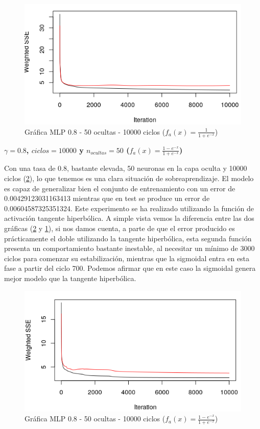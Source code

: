 \documentclass[11pt,spanish,listoffigures,listoftables]{tfgetsinf}
\begin{document}
\begin{figure}[H]
\centering
\includegraphics[scale=0.5]{500810000sig}
\caption{Gráfica MLP 0.8 - 50 ocultas - 10000 ciclos ($f_{a}(x) = \frac{1}{1+e^{-x}}$)}\label{fig:500810000sig}
\end{figure}

\par \textbf{$\gamma = 0.8$, $ciclos = 10000$ y $n_{ocultas} = 50$ ($f_{a}(x) = \frac{1-e^{-x}}{1+e^{-x}}$)}

\par Con una tasa de 0.8, bastante elevada, 50 neuronas en la capa oculta y 10000 ciclos (\ref{fig:500810000tan}), lo que tenemos es una clara situación de sobreaprendizaje. El modelo es capaz de generalizar bien el conjunto de entrenamiento con un error de 0.00429123031163413 mientras que en test se produce un error de 0.00604587325351324. Este experimento se ha realizado utilizando la función de activación tangente hiperbólica. A simple vista vemos la diferencia entre las dos gráficas (\ref{fig:500810000tan} y \ref{fig:500810000sig}), si nos damos cuenta, a parte de que el error producido es prácticamente el doble utilizando la tangente hiperbólica, esta segunda función presenta un comportamiento bastante inestable, al necesitar un mínimo de 3000 ciclos para comenzar su estabilización, mientras que la sigmoidal entra en esta fase a partir del ciclo 700. Podemos afirmar que en este caso la sigmoidal genera mejor modelo que la tangente hiperbólica.

\begin{figure}[H]
\centering
\includegraphics[scale=0.5]{500810000tan}
\caption{Gráfica MLP 0.8 - 50 ocultas - 10000 ciclos ($f_{a}(x) = \frac{1-e^{-x}}{1+e^{-x}}$)}\label{fig:500810000tan}
\end{figure}
\end{document}
